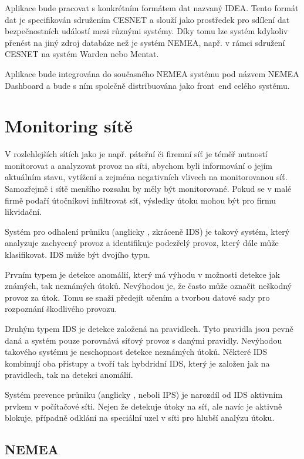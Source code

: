 Aplikace bude pracovat s konkrétním formátem dat nazvaný IDEA. Tento formát dat je specifikován sdružením CESNET a slouží jako prostředek pro sdílení dat bezpečnostních událostí mezi různými systémy. Díky tomu lze systém kdykoliv přenést na jiný zdroj databáze než je systém NEMEA, např. v rámci sdružení CESNET na systém Warden nebo Mentat.

Aplikace bude integrována do současného NEMEA systému pod názvem NEMEA Dashboard a bude s ním společně distribuována jako front~end celého systému.

\chapter{Monitoring sítě}

V rozlehlejších sítích jako je např. páteřní či firemní síť je téměř nutností monitorovat a analyzovat provoz na síti, abychom byli informování o jejím aktuálním stavu, vytížení a zejména negativních vlivech na monitorovanou síť. Samozřejmě i sítě menšího rozsahu by měly být monitorované. Pokud se v malé firmě podaří útočníkovi infiltrovat síť, výsledky útoku mohou být pro firmu likvidační.

Systém pro odhalení průniku (anglicky , zkráceně IDS)\cite{idsips} je takový systém, který analyzuje zachycený provoz a identifikuje podezřelý provoz, který dále může klasifikovat. IDS může být dvojího typu. 

Prvním typem je detekce anomálií, který má výhodu v možnosti detekce jak známých, tak neznámých útoků. Nevýhodou je, že často může označit neškodný provoz za útok. Tomu se snaží předejít učením a tvorbou datové sady pro rozpoznání škodlivého provozu.

Druhým typem IDS je detekce založená na pravidlech. Tyto pravidla jsou pevně daná a systém pouze porovnává síťový provoz s danými pravidly. Nevýhodou takového systému je neschopnost detekce neznámých útoků. Některé IDS kombinují oba přístupy a tvoří tak hybdridní IDS, který je založen jak na pravidlech, tak na detekci anomálií.

Systém prevence průniku (anglicky , neboli IPS)\cite{idsips} je narozdíl od IDS aktivním prvkem v počítačové síti. Nejen že detekuje útoky na síť, ale navíc je aktivně blokuje, případně odklání na speciální uzel v síti pro hlubší analýzu útoku.

\section{NEMEA}

